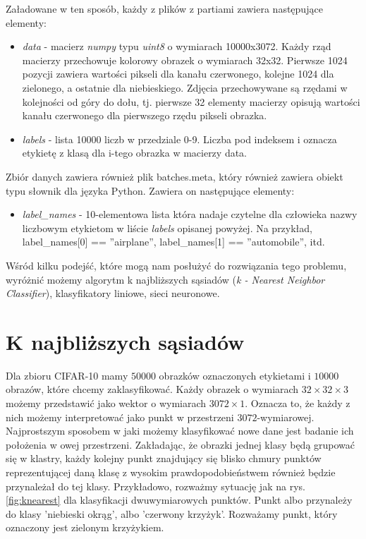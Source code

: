     Załadowane w ten sposób, każdy z plików z partiami zawiera następujące elementy:
\begin{itemize}
\item \textit{data} - macierz \textit{numpy} typu \textit{uint8} o wymiarach 10000x3072. Każdy rząd macierzy przechowuje kolorowy obrazek o wymiarach 32x32. Pierwsze 1024 pozycji zawiera wartości pikseli dla kanału czerwonego, kolejne 1024 dla zielonego, a ostatnie dla niebieskiego. Zdjęcia przechowywane są rzędami w kolejności od góry do dołu, tj. pierwsze 32 elementy macierzy opisują wartości kanału czerwonego dla pierwszego rzędu pikseli obrazka.
\item \textit{labels} - lista 10000 liczb w przedziale 0-9. Liczba pod indeksem i oznacza etykietę z klasą dla i-tego obrazka w macierzy data.
\end{itemize}

Zbiór danych zawiera również plik batches.meta, który również zawiera obiekt typu słownik dla języka Python. Zawiera on następujące elementy:
\begin{itemize}
\item \textit{label\_names} - 10-elementowa lista która nadaje czytelne dla człowieka nazwy liczbowym etykietom w liście \textit{labels} opisanej powyżej. Na przykład, label\_names[0] == ''airplane'', label\_names[1] == ''automobile'', itd. \cite{Krizhevsky09learningmultiple}
\end{itemize}

Wśród kilku podejść, które mogą nam posłużyć do rozwiązania tego problemu, wyróżnić możemy algorytm k najbliższych sąsiadów (\textit{k - Nearest Neighbor Classifier}), klasyfikatory liniowe, sieci neuronowe.

\section{K najbliższych sąsiadów}\label{sec:knear}

Dla zbioru CIFAR-10 mamy $50000$ obrazków oznaczonych etykietami i $10000$ obrazów, które chcemy zaklasyfikować.
Każdy obrazek o wymiarach $32 \times 32 \times 3$ możemy przedstawić jako wektor o wymiarach $3072 \times 1$.
Oznacza to, że każdy z nich możemy interpretować jako punkt w przestrzeni $3072$-wymiarowej.
Najprostszym sposobem w jaki możemy klasyfikować nowe dane jest badanie ich położenia w owej przestrzeni.
Zakładając, że obrazki jednej klasy będą grupować się w klastry, każdy kolejny punkt znajdujący się blisko chmury punktów reprezentującej daną klasę z wysokim prawdopodobieństwem również będzie przynależał do tej klasy.
Przykładowo, rozważmy sytuację jak na rys. \ref{fig:knearest} dla klasyfikacji dwuwymiarowych punktów. Punkt albo przynależy do klasy 'niebieski okrąg', albo 'czerwony krzyżyk'. Rozważamy punkt, który oznaczony jest zielonym krzyżykiem.

